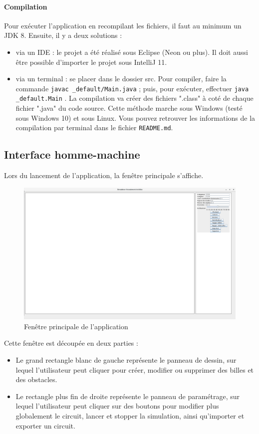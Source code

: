 \documentclass{report}
\begin{document}
\paragraph*{Compilation} Pour exécuter l'application en recompilant les fichiers, il faut au minimum un JDK 8. Ensuite, il y a deux solutions :
\begin{itemize}
\item via un IDE : le projet a été réalisé sous Eclipse (Neon ou plus). Il doit aussi être possible d'importer le projet sous IntelliJ 11.
\item via un terminal : se placer dans le dossier src. Pour compiler, faire la commande \texttt{javac \_default/Main.java} ; puis, pour exécuter, effectuer \texttt{java \_default.Main} . La compilation va créer des fichiers ".class" à coté de chaque fichier ".java" du code source. Cette méthode marche sous Windows (testé sous Windows 10) et sous Linux. Vous pouvez retrouver les informations de la compilation par terminal dans le fichier \texttt{README.md}.

\end{itemize}

\newpage
\subsection{Interface homme-machine}

Lors du lancement de l’application, la fenêtre principale s’affiche.

\begin{figure}[H]
\centering
\includegraphics[scale=0.25]{main_frame.png}
\caption{Fenêtre principale de l'application}
\end{figure}

Cette fenêtre est découpée en deux parties :
\begin{itemize}
\item Le grand rectangle blanc de gauche représente le panneau de dessin, sur lequel l’utilisateur peut cliquer pour créer, modifier ou supprimer des billes et des obstacles.
\item Le rectangle plus fin de droite représente le panneau de paramétrage, sur lequel l’utilisateur peut cliquer sur des boutons pour modifier plus globalement le circuit, lancer et stopper la simulation, ainsi qu’importer et exporter un circuit.
\end{itemize}
\end{document}
